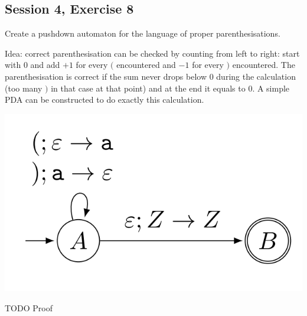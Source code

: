 \subsection{Session 4, Exercise 8}


Create a pushdown automaton for the language of proper parenthesisations.


Idea: correct parenthesisation can be checked by counting from left to right: start with $0$ and add $+1$ for every $($ encountered and $-1$ for every $)$ encountered. The parenthesisation is correct if the sum never drops below $0$ during the calculation (too many $)$ in that case at that point) and at the end it equals to $0$. A simple PDA can be constructed to do exactly this calculation.


\includegraphics[width=0.4\linewidth]{04/4_8.png}

TODO Proof
